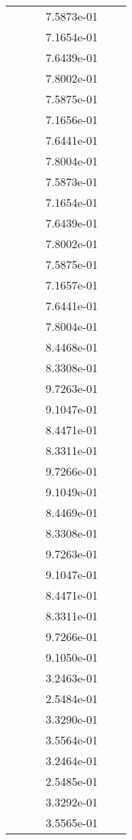 \begin{xltabular}{\textwidth}{r|rS[table-format=1.3e+2]S[table-format=1.4e+2]S[table-format=1.4e+2]S[table-format=-1.5]}
&  &  & 7.5873e-01 & & \\
&  &  & 7.1654e-01 & & \\
&  &  & 7.6439e-01 & & \\
&  &  & 7.8002e-01 & & \\
&  &  & 7.5875e-01 & & \\
&  &  & 7.1656e-01 & & \\
&  &  & 7.6441e-01 & & \\
&  &  & 7.8004e-01 & & \\
&  &  & 7.5873e-01 & & \\
&  &  & 7.1654e-01 & & \\
&  &  & 7.6439e-01 & & \\
&  &  & 7.8002e-01 & & \\
&  &  & 7.5875e-01 & & \\
&  &  & 7.1657e-01 & & \\
&  &  & 7.6441e-01 & & \\
&  &  & 7.8004e-01 & & \\
&  &  & 8.4468e-01 & & \\
&  &  & 8.3308e-01 & & \\
&  &  & 9.7263e-01 & & \\
&  &  & 9.1047e-01 & & \\
&  &  & 8.4471e-01 & & \\
&  &  & 8.3311e-01 & & \\
&  &  & 9.7266e-01 & & \\
&  &  & 9.1049e-01 & & \\
&  &  & 8.4469e-01 & & \\
&  &  & 8.3308e-01 & & \\
&  &  & 9.7263e-01 & & \\
&  &  & 9.1047e-01 & & \\
&  &  & 8.4471e-01 & & \\
&  &  & 8.3311e-01 & & \\
&  &  & 9.7266e-01 & & \\
&  &  & 9.1050e-01 & & \\
&  &  & 3.2463e-01 & & \\
&  &  & 2.5484e-01 & & \\
&  &  & 3.3290e-01 & & \\
&  &  & 3.5564e-01 & & \\
&  &  & 3.2464e-01 & & \\
&  &  & 2.5485e-01 & & \\
&  &  & 3.3292e-01 & & \\
&  &  & 3.5565e-01 & & \\

\end{xltabular}
